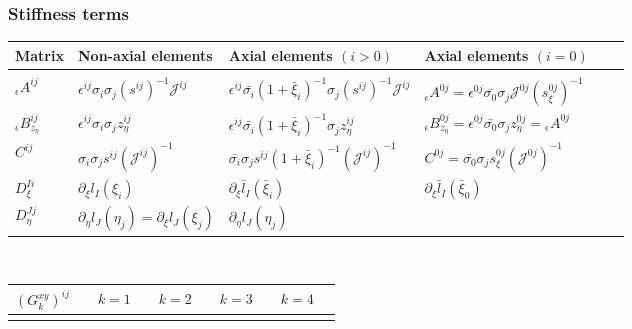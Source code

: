 \documentclass[11pt,letter,fleqn,english,notitlepage]{article}
\begin{document}
\subsubsection{Stiffness terms}\label{section:stiffness}
%
\begin{table*} 
\begin{minipage}{156mm}
\begin{center}
\caption{Definitions for precomputable matrices of the stiffness term
($\epsilon=\lambda,~\mu$ or any combination thereof).}
\label{table:precomp} 
\begin{tabular}{@{}llllll}
\hline\hline
Matrix & Non-axial elements & Axial elements $(i>0)$ & Axial elements $(i=0)$\\
\hline\\
${}_{\epsilon}{A}^{ij}$  &  
$\epsilon^{ij}\sigma_i\sigma_j (s^{ij})^{-1}{\mathcal J}^{ij}$ &
$\epsilon^{ij}
\bar{\sigma_i}(1+\bar{\xi}_i)^{-1}\sigma_j (s^{ij})^{-1}{\mathcal J}^{ij}$ &
${}_\epsilon{A}^{0j}=\epsilon^{0j}
\bar{\sigma_0} \sigma_j {\mathcal J}^{0j}(s_\xi^{0j})^{-1}$ \\[10pt]
${}_\epsilon{B}_{z_\eta}^{ij}$ & 
$\epsilon^{ij}\sigma_i\sigma_j z_\eta^{ij}$ &
$\epsilon^{ij}\bar{\sigma_i}(1+\bar{\xi}_i)^{-1}\sigma_j z_\eta^{ij}$ &
${}_\epsilon{B}^{0j}_{z_\eta}=\epsilon^{0j}
\bar{\sigma_0}\sigma_j z_\eta^{0j}={}_\epsilon{A}^{0j}   $ \\[10pt]
$C^{ij}$ & 
$\sigma_i\sigma_j s^{ij} ({\mathcal J}^{ij})^{-1}$ &
$\bar{\sigma_i}\sigma_js^{ij}(1+\bar{\xi}_i)^{-1} ({\mathcal J}^{ij})^{-1}$ &
$C^{0j}=\bar{\sigma_0}\sigma_js_\xi^{0j} ({\mathcal J}^{0j})^{-1}$ \\[10pt]
$D_{\xi}^{Ii}$ & 
$\partial_\xi l_I(\xi_i)$ &
$\partial_\xi \bar{l}_I(\bar{\xi}_i)$ &
$\partial_\xi \bar{l}_I(\bar{\xi}_0)$ \\[10pt]
$D_{\eta}^{Jj}$ & 
$\partial_\eta l_J(\eta_j)=\partial_\xi l_J(\xi_j)$ &
$\partial_\eta l_J(\eta_j)$ & \\[5pt]
%
\hline\hline
\end{tabular}
%
\vspace{0.2cm}\\ 
\begin{tabular}{@{}llllll}
$(G_k^{xy})^{ij}$ &$\hspace{1em} k=1$ &$\hspace{1em} k=2$ &$\hspace{1em} k=3 $
&$\hspace{1em} k=4$ \\
\hline\vspace{0.1cm} 

\end{tabular}
\end{center}
\end{minipage}
\end{table*}
\end{document}
